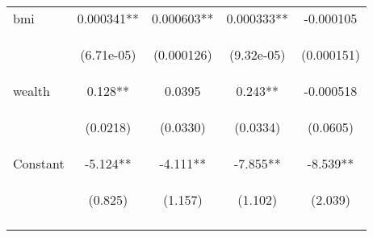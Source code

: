 \documentclass[]{article}
\begin{document}
\begin{center}
\begin{tabular}{lcccc}
bmi & 0.000341** & 0.000603** & 0.000333** & -0.000105 \\
\vspace{4pt} & \begin{footnotesize}(6.71e-05)\end{footnotesize} & \begin{footnotesize}(0.000126)\end{footnotesize} & \begin{footnotesize}(9.32e-05)\end{footnotesize} & \begin{footnotesize}(0.000151)\end{footnotesize} \\
wealth & 0.128** & 0.0395 & 0.243** & -0.000518 \\
\vspace{4pt} & \begin{footnotesize}(0.0218)\end{footnotesize} & \begin{footnotesize}(0.0330)\end{footnotesize} & \begin{footnotesize}(0.0334)\end{footnotesize} & \begin{footnotesize}(0.0605)\end{footnotesize} \\
Constant & -5.124** & -4.111** & -7.855** & -8.539** \\
 & \begin{footnotesize}(0.825)\end{footnotesize} & \begin{footnotesize}(1.157)\end{footnotesize} & \begin{footnotesize}(1.102)\end{footnotesize} & \begin{footnotesize}(2.039)\end{footnotesize} \\
\vspace{4pt} & \begin{footnotesize}\end{footnotesize} & \begin{footnotesize}\end{footnotesize} & \begin{footnotesize}\end{footnotesize} & \begin{footnotesize}\end{footnotesize} \\

\end{tabular}
\end{center}
\end{document}
